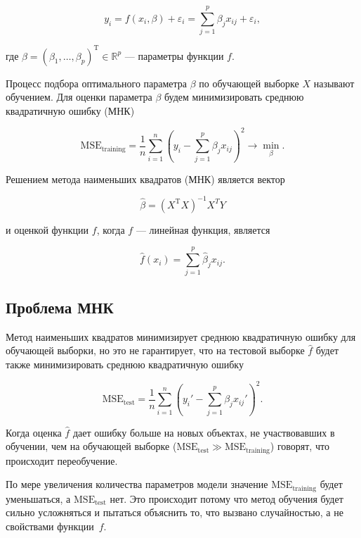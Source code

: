 \documentclass[specialist,
               subf,href,colorlinks=true, 12pt,a4paper]{article} %
\newcommand{\R}{\mathbb{R}}
\newcommand{\T}{\mathrm{T}}
\numberwithin{equation}{section}
\begin{document}
\begin{equation*}
y_i = f(x_i, \beta) + \varepsilon_i = \sum_{j=1}^p \beta_j x_{ij} + \varepsilon_i,
\end{equation*}

где $\beta = (\beta_1, \ldots, \beta_p)^{\T} \in \R^p$ --- параметры функции $f$.

Процесс подбора оптимального параметра $\beta$ по обучающей выборке $X$ называют обучением. Для оценки параметра $\beta$ будем минимизировать среднюю квадратичную ошибку (МНК)

\begin{equation*}
\mathrm{MSE}_{\mathrm{training}} = \frac{1}{n}\sum_{i=1}^n(y_i - \sum_{j=1}^p \beta_j x_{ij})^2 \rightarrow \min_{\beta}.
\end{equation*}

Решением метода наименьших квадратов (МНК) является вектор

\begin{equation*}
\hat{\beta} = (X^{\T}X)^{-1} X^{T}Y
\end{equation*}

и оценкой функции $f$, когда $f$ --- линейная функция, является  

\begin{equation*}
\hat{f}(x_i) = \sum_{j=1}^p \hat{\beta}_j x_{ij}.
\end{equation*}

\subsection{Проблема МНК}

Метод наименьших квадратов минимизирует среднюю квадратичную ошибку для обучающей выборки, но это не гарантирует, что на тестовой выборке $\hat{f}$ будет также минимизировать среднюю квадратичную ошибку

\begin{equation*}
\mathrm{MSE}_{\mathrm{test}} = \frac{1}{n}\sum_{i=1}^n(y_i' - \sum_{j=1}^p \beta_j x_{ij}')^2.
\end{equation*}

Когда оценка $\hat{f}$ дает ошибку больше на новых объектах, не участвовавших в обучении, чем на обучающей выборке ($\mathrm{MSE}_{\mathrm{test}} \gg \mathrm{MSE}_{\mathrm{training}}  $) говорят, что происходит переобучение. 

По мере увеличения количества параметров модели значение $\mathrm{MSE}_{\mathrm{training}}$ будет уменьшаться, а $\mathrm{MSE}_{\mathrm{test}}$ нет. Это происходит потому что метод обучения будет сильно усложняться и пытаться объяснить то, что вызвано случайностью, а не свойствами функции~$f$.
\end{document}
